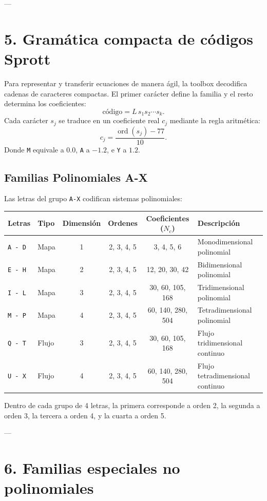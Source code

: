 \documentclass[11pt]{article}
\newcommand{\code}[1]{\texttt{#1}}
\begin{document}
---

\section{5. Gramática compacta de códigos Sprott}

Para representar y transferir ecuaciones de manera ágil, la toolbox decodifica cadenas de caracteres compactas. El primer carácter define la familia y el resto determina los coeficientes:
\[
\text{código} = L \, s_1 s_2 \cdots s_k.
\]
Cada carácter $s_j$ se traduce en un coeficiente real $c_j$ mediante la regla aritmética:
\[
c_j = \frac{\operatorname{ord}(s_j) - 77}{10}.
\]
Donde \code{M} equivale a $0.0$, \code{A} a $-1.2$, e \code{Y} a $1.2$.

\subsection{Familias Polinomiales A-X}

Las letras del grupo \code{A-X} codifican sistemas polinomiales:

\begin{center}
\begin{tabular}{llcccl}
\toprule
Letras & Tipo & Dimensión & Ordenes & Coeficientes ($N_c$) & Descripción \\
\midrule
\code{A - D} & Mapa & 1 & 2, 3, 4, 5 & 3, 4, 5, 6 & Monodimensional polinomial \\
\code{E - H} & Mapa & 2 & 2, 3, 4, 5 & 12, 20, 30, 42 & Bidimensional polinomial \\
\code{I - L} & Mapa & 3 & 2, 3, 4, 5 & 30, 60, 105, 168 & Tridimensional polinomial \\
\code{M - P} & Mapa & 4 & 2, 3, 4, 5 & 60, 140, 280, 504 & Tetradimensional polinomial \\
\code{Q - T} & Flujo & 3 & 2, 3, 4, 5 & 30, 60, 105, 168 & Flujo tridimensional continuo \\
\code{U - X} & Flujo & 4 & 2, 3, 4, 5 & 60, 140, 280, 504 & Flujo tetradimensional continuo \\
\bottomrule
\end{tabular}
\end{center}

Dentro de cada grupo de 4 letras, la primera corresponde a orden 2, la segunda a orden 3, la tercera a orden 4, y la cuarta a orden 5.

---

\section{6. Familias especiales no polinomiales}
\end{document}
